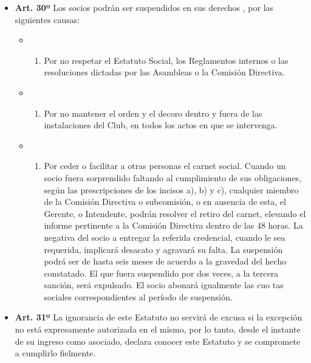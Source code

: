 \documentclass[]{book}
\providecommand{\tightlist}{%
  \setlength{\itemsep}{0pt}\setlength{\parskip}{0pt}}
\begin{document}
\begin{itemize}
\tightlist
\item
  \textbf{Art. 30º} Los socios podrán ser suspendidos en sus derechos ,
  por las siguientes causas:

  \begin{itemize}
  \item
    \begin{enumerate}
    \def\labelenumi{\alph{enumi})}
    \tightlist
    \item
      Por no respetar el Estatuto Social, los Reglamentos internos o las
      resoluciones dictadas por las Asambleas o la Comisión Directiva.
    \end{enumerate}
  \item
    \begin{enumerate}
    \def\labelenumi{\alph{enumi})}
    \setcounter{enumi}{1}
    \tightlist
    \item
      Por no mantener el orden y el decoro dentro y fuera de las
      instalaciones del Club, en todos los actos en que se intervenga.
    \end{enumerate}
  \item
    \begin{enumerate}
    \def\labelenumi{\alph{enumi})}
    \setcounter{enumi}{2}
    \tightlist
    \item
      Por ceder o facilitar a otras personas el carnet social. Cuando un
      socio fuera sorprendido faltando al cumplimiento de sus
      obligaciones, según las prescripciones de los incisos a), b) y c),
      cualquier miembro de la Comisión Directiva o subcomisión, o en
      ausencia de esta, el Gerente, o Intendente, podrán resolver el
      retiro del carnet, elevando el informe pertinente a la Comisión
      Directiva dentro de las 48 horas. La negativa del socio a entregar
      la referida credencial, cuando le sea requerida, implicará
      desacato y agravará su falta. La suspensión podrá ser de hasta
      seis meses de acuerdo a la gravedad del hecho constatado. El que
      fuera suspendido por dos veces, a la tercera sanción, será
      expulsado. El socio abonará igualmente las cuo tas sociales
      correspondientes al período de suspensión.
    \end{enumerate}
  \end{itemize}
\end{itemize}

\begin{itemize}
\tightlist
\item
  \textbf{Art. 31º} La ignorancia de este Estatuto no servirá de excusa
  si la excepción no está expresamente autorizada en el mismo, por lo
  tanto, desde el instante de su ingreso como asociado, declara conocer
  este Estatuto y se compromete a cumplirlo fielmente.
\end{itemize}
\end{document}
